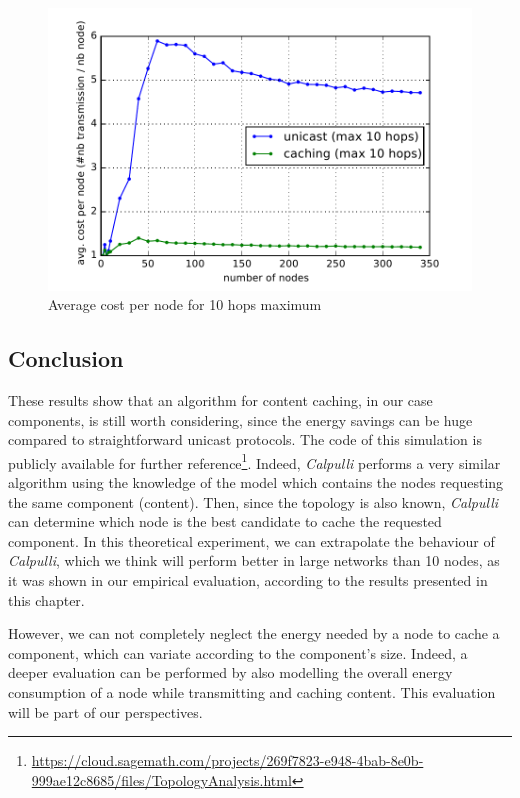 \begin{figure}[]
	\centering
	\includegraphics[width=0.8 \columnwidth]{chapters/inter-node.images/avg-cost-per-node-10.pdf}
	\caption{Average cost per node for 10 hops maximum} \label{fig:AvgCostPerNode10hops}
\end{figure}

\subsection{Conclusion}
These results show that an algorithm for content caching, in our case components, is still worth considering, since the energy savings can be huge compared to straightforward unicast protocols.
The code of this simulation is publicly available for further reference\footnote{\url{https://cloud.sagemath.com/projects/269f7823-e948-4bab-8e0b-999ae12c8685/files/TopologyAnalysis.html}}.
Indeed, \textit{Calpulli} performs a very similar algorithm using the knowledge of the model which contains the nodes requesting the same component (content).
Then, since the topology is also known, \textit{Calpulli} can determine which node is the best candidate to cache the requested component.
In this theoretical experiment, we can extrapolate the behaviour of \textit{Calpulli}, which we think will perform better in large networks than 10 nodes, as it was shown in our empirical evaluation, according to the results presented in this chapter.

However, we can not completely neglect the energy needed by a node to cache a component, which can variate according to the component's size.
Indeed, a deeper evaluation can be performed by also modelling the overall energy consumption of a node while transmitting and caching content.
This evaluation will be part of our perspectives.


